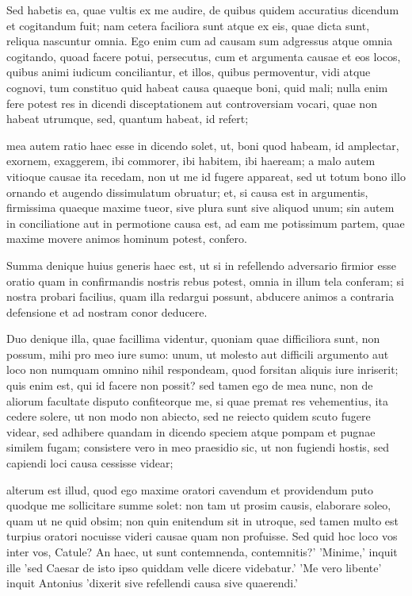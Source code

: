  Sed habetis ea, quae vultis ex me audire, de quibus quidem accuratius dicendum et cogitandum fuit; nam cetera faciliora sunt atque ex eis, quae dicta sunt, reliqua nascuntur omnia. Ego enim cum ad causam sum adgressus atque omnia cogitando, quoad facere potui, persecutus, cum et argumenta causae et eos locos, quibus animi iudicum conciliantur, et illos, quibus permoventur, vidi atque cognovi, tum constituo quid habeat causa quaeque boni, quid mali; nulla enim fere potest res in dicendi disceptationem aut controversiam vocari, quae non habeat utrumque, sed, quantum habeat, id refert;

 mea autem ratio haec esse in dicendo solet, ut, boni quod habeam, id amplectar, exornem, exaggerem, ibi commorer, ibi habitem, ibi haeream; a malo autem vitioque causae ita recedam, non ut me id fugere appareat, sed ut totum bono illo ornando et augendo dissimulatum obruatur; et, si causa est in argumentis, firmissima quaeque maxime tueor, sive plura sunt sive aliquod unum; sin autem in conciliatione aut in permotione causa est, ad eam me potissimum partem, quae maxime movere animos hominum potest, confero.

 Summa denique huius generis haec est, ut si in refellendo adversario firmior esse oratio quam in confirmandis nostris rebus potest, omnia in illum tela conferam; si nostra probari facilius, quam illa redargui possunt, abducere animos a contraria defensione et ad nostram conor deducere.

 Duo denique illa, quae facillima videntur, quoniam quae difficiliora sunt, non possum, mihi pro meo iure sumo: unum, ut molesto aut difficili argumento aut loco non numquam omnino nihil respondeam, quod forsitan aliquis iure inriserit; quis enim est, qui id facere non possit? sed tamen ego de mea nunc, non de aliorum facultate disputo confiteorque me, si quae premat res vehementius, ita cedere solere, ut non modo non abiecto, sed ne reiecto quidem scuto fugere videar, sed adhibere quandam in dicendo speciem atque pompam et pugnae similem fugam; consistere vero in meo praesidio sic, ut non fugiendi hostis, sed capiendi loci causa cessisse videar;

 alterum est illud, quod ego maxime oratori cavendum et providendum puto quodque me sollicitare summe solet: non tam ut prosim causis, elaborare soleo, quam ut ne quid obsim; non quin enitendum sit in utroque, sed tamen multo est turpius oratori nocuisse videri causae quam non profuisse. Sed quid hoc loco vos inter vos, Catule? An haec, ut sunt contemnenda, contemnitis?' 'Minime,' inquit ille 'sed Caesar de isto ipso quiddam velle dicere videbatur.' 'Me vero libente' inquit Antonius 'dixerit sive refellendi causa sive quaerendi.'

